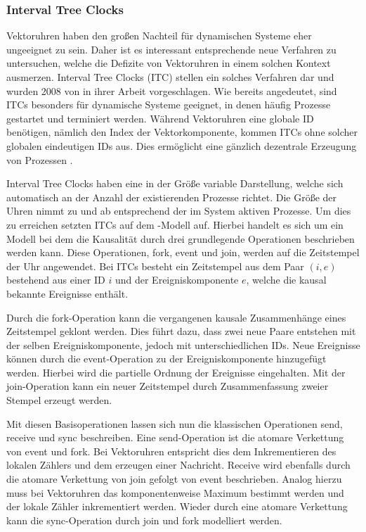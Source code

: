 \subsubsection{Interval Tree Clocks}
Vektoruhren haben den großen Nachteil für dynamischen Systeme eher ungeeignet zu sein.
Daher ist es interessant entsprechende neue Verfahren zu untersuchen, welche die Defizite von Vektoruhren in einem solchen Kontext ausmerzen.
Interval Tree Clocks (ITC) stellen ein solches Verfahren dar und wurden 2008 von  in ihrer Arbeit  \cite{almeida2008treeclocks} vorgeschlagen.
Wie bereits angedeutet, sind ITCs besonders für dynamische Systeme geeignet, in denen häufig Prozesse gestartet und terminiert werden.
Während Vektoruhren eine globale ID benötigen, nämlich den Index der Vektorkomponente, kommen ITCs ohne solcher globalen eindeutigen IDs aus. Dies ermöglicht eine gänzlich dezentrale Erzeugung von Prozessen \cite{almeida2008treeclocks}.

Interval Tree Clocks haben eine in der Größe variable Darstellung, welche sich automatisch an der Anzahl der existierenden Prozesse richtet. Die Größe der Uhren nimmt zu und ab entsprechend der im System aktiven Prozesse.
Um dies zu erreichen setzten ITCs auf dem -Modell auf.
Hierbei handelt es sich um ein Modell bei dem die Kausalität durch drei grundlegende Operationen beschrieben werden kann.
Diese Operationen, fork, event und join, werden auf die Zeitstempel der Uhr angewendet.
Bei ITCs besteht ein Zeitstempel aus dem Paar $(i,e)$ bestehend aus einer ID $i$ und der Ereigniskomponente $e$, welche die kausal bekannte Ereignisse enthält.

Durch die fork-Operation kann die vergangenen kausale Zusammenhänge eines Zeitstempel geklont werden.
Dies führt dazu, dass zwei neue Paare entstehen mit der selben Ereigniskomponente, jedoch mit unterschiedlichen IDs.
Neue Ereignisse können durch die event-Operation zu der Ereigniskomponente hinzugefügt werden. 
Hierbei wird die partielle Ordnung der Ereignisse eingehalten.
Mit der join-Operation kann ein neuer Zeitstempel durch Zusammenfassung zweier Stempel erzeugt werden.

Mit diesen Basisoperationen lassen sich nun die klassischen Operationen send, receive und sync beschreiben.
Eine send-Operation ist die atomare Verkettung von event und fork.
Bei Vektoruhren entspricht dies dem Inkrementieren des lokalen Zählers und dem erzeugen einer Nachricht.
Receive wird ebenfalls durch die atomare Verkettung von join gefolgt von event beschrieben.
Analog hierzu muss bei Vektoruhren das komponentenweise Maximum bestimmt werden und der lokale Zähler inkrementiert werden.
Wieder durch eine atomare Verkettung kann die sync-Operation durch join und fork modelliert werden.


